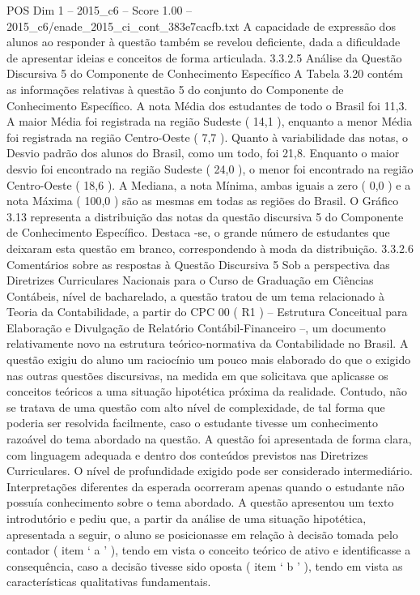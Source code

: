 \begin{textsample}{POS Dim 1 – 2015\_c6 – Score 1.00 – 2015\_c6/enade\_2015\_ci\_cont\_383e7cacfb.txt}
A capacidade de expressão dos alunos ao responder à questão também se revelou deficiente, dada a dificuldade de apresentar ideias e conceitos de forma articulada. 3.3.2.5 Análise da Questão Discursiva 5 do Componente de Conhecimento Específico A Tabela 3.20 contém as informações relativas à questão 5 do conjunto do Componente de Conhecimento Específico.
A nota Média dos estudantes de todo o Brasil foi 11,3.
A maior Média foi registrada na região Sudeste ( 14,1 ), enquanto a menor Média foi registrada na região Centro-Oeste ( 7,7 ).
Quanto à variabilidade das notas, o Desvio padrão dos alunos do Brasil, como um todo, foi 21,8.
Enquanto o maior desvio foi encontrado na região Sudeste ( 24,0 ), o menor foi encontrado na região Centro-Oeste ( 18,6 ).
A Mediana, a nota Mínima, ambas iguais a zero ( 0,0 ) e a nota Máxima ( 100,0 ) são as mesmas em todas as regiões do Brasil.
O Gráfico 3.13 representa a distribuição das notas da questão discursiva 5 do Componente de Conhecimento Específico.
Destaca -se, o grande número de estudantes que deixaram esta questão em branco, correspondendo à moda da distribuição. 3.3.2.6 Comentários sobre as respostas à Questão Discursiva 5 Sob a perspectiva das Diretrizes Curriculares Nacionais para o Curso de Graduação em Ciências Contábeis, nível de bacharelado, a questão tratou de um tema relacionado à Teoria da Contabilidade, a partir do CPC 00 ( R1 ) – Estrutura Conceitual para Elaboração e Divulgação de Relatório Contábil-Financeiro –, um documento relativamente novo na estrutura teórico-normativa da Contabilidade no Brasil.
A questão exigiu do aluno um raciocínio um pouco mais elaborado do que o exigido nas outras questões discursivas, na medida em que solicitava que aplicasse os conceitos teóricos a uma situação hipotética próxima da realidade.
Contudo, não se tratava de uma questão com alto nível de complexidade, de tal forma que poderia ser resolvida facilmente, caso o estudante tivesse um conhecimento razoável do tema abordado na questão.
A questão foi apresentada de forma clara, com linguagem adequada e dentro dos conteúdos previstos nas Diretrizes Curriculares.
O nível de profundidade exigido pode ser considerado intermediário.
Interpretações diferentes da esperada ocorreram apenas quando o estudante não possuía conhecimento sobre o tema abordado.
A questão apresentou um texto introdutório e pediu que, a partir da análise de uma situação hipotética, apresentada a seguir, o aluno se posicionasse em relação à decisão tomada pelo contador ( item ‘ a ’ ), tendo em vista o conceito teórico de ativo e identificasse a consequência, caso a decisão tivesse sido oposta ( item ‘ b ’ ), tendo em vista as características qualitativas fundamentais.

\end{textsample}
